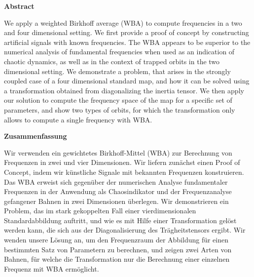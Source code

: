 \newpage
\begin{center}\large\bfseries Abstract\end{center}

We apply a weighted Birkhoff average (WBA) to compute frequencies in a two and four dimensional setting.
We first provide a proof of concept by constructing artificial signals with known frequencies. %
The WBA appears to be superior to the numerical analysis of fundamental frequencies when used as an indication of chaotic dynamics, as well as in the context of trapped orbits in the two dimensional setting.
We demonstrate a problem, that arises in the strongly coupled case of a four dimensional standard map, and how it can be solved using a transformation obtained from diagonalizing the inertia tensor.
We then apply our solution to compute the frequency space of the map for a specific set of parameters, and show two types of orbits, for which the transformation only allows to compute a single frequency with WBA. 

\vspace*{11em}
\begin{center}\large\bfseries Zusammenfassung\end{center}

Wir verwenden ein gewichtetes Birkhoff-Mittel (WBA) zur Berechnung von Frequenzen in zwei und vier Dimensionen.
Wir liefern zunächst einen Proof of Concept, indem wir künstliche Signale mit bekannten Frequenzen konstruieren. %
Das WBA erweist sich gegenüber der numerischen Analyse fundamentaler Frequenzen in der Anwendung als Chaosindikator und der Frequenzanalyse gefangener Bahnen in zwei Dimensionen überlegen.
Wir demonstrieren ein Problem, das im stark gekoppelten Fall einer vierdimensionalen Standardabbildung auftritt, und wie es mit Hilfe einer Transformation gelöst werden kann, die sich aus der Diagonalisierung des Trägheitstensors ergibt.
Wir wenden unsere Lösung an, um den Frequenzraum der Abbildung für einen bestimmten Satz von Parametern zu berechnen, und zeigen zwei Arten von Bahnen, für welche die Transformation nur die Berechnung einer einzelnen Frequenz mit WBA ermöglicht. 
